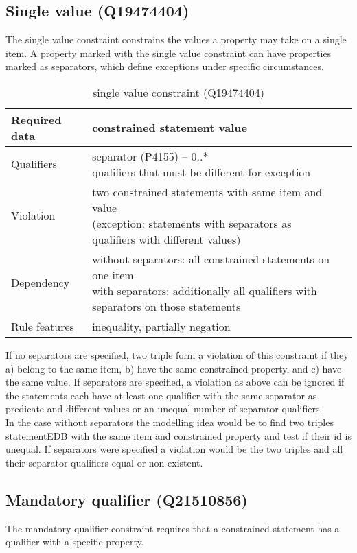 \documentclass[hyperref,bachelorofscience,fleqn]{cgvpub}
\begin{document}
\subsection{Single value (Q19474404)}
The single value constraint constrains the values a property may take on a single item. A property marked with the single value constraint can have properties marked as separators, which define exceptions under specific circumstances.
\begin{table}[H]
\caption{single value constraint (Q19474404)}
\begin{tabularx}{\textwidth}{ ll X}
\hline
Required data & constrained statement value \\
\hline
Qualifiers & \makecell{separator (P4155) -- 0..* \\ qualifiers that must be different for exception} \\
\hline
Violation & \makecell{two constrained statements with same item and value \\ (exception: statements with separators as qualifiers with different values)} \\
\hline
Dependency & \makecell{without separators: all constrained statements on one item \\ with separators: additionally all qualifiers with separators on those statements }\\
\hline
Rule features & inequality, partially negation \\
\hline
\end{tabularx}
\end{table}

If no separators are specified, two triple form a violation of this constraint if they a) belong to the same item, b) have the same constrained property, and c) have the same value.
If separators are specified, a violation as above can be ignored if the statements each have at least one qualifier with the same separator as predicate and different values or an unequal number of separator qualifiers.\\
In the case without separators the modelling idea would be to find two triples statementEDB with the same item and constrained property and test if their id is unequal. If separators were specified a violation would be the two triples and all their separator qualifiers equal or non-existent.

\subsection{Mandatory qualifier (Q21510856)}
The mandatory qualifier constraint requires that a constrained statement has a qualifier with a specific property.
\end{document}
